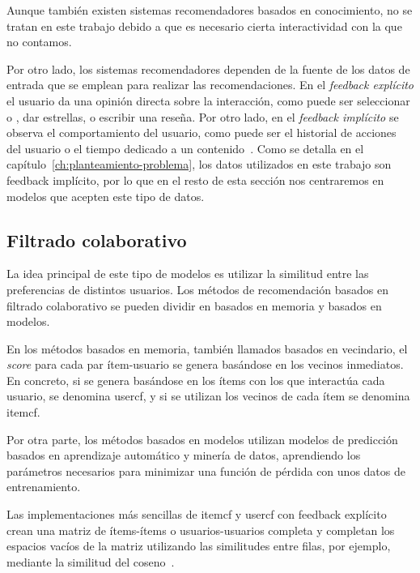Aunque también existen sistemas recomendadores basados en conocimiento, no se tratan en este trabajo debido a que es necesario cierta interactividad con la que no contamos.

Por otro lado, los sistemas recomendadores dependen de la fuente de los datos de entrada que se emplean para realizar las recomendaciones. En el \textit{feedback explícito} el usuario da una opinión directa sobre la interacción, como puede ser seleccionar  o , dar estrellas, o escribir una reseña. Por otro lado, en el \textit{feedback implícito} se observa el comportamiento del usuario, como puede ser el historial de acciones del usuario o el tiempo dedicado a un contenido~\cite{jawaheer_comparison_2010}. Como se detalla en el capítulo~\ref{ch:planteamiento-problema}, los datos utilizados en este trabajo son feedback implícito, por lo que en el resto de esta sección nos centraremos en modelos que acepten este tipo de datos.

\subsection{Filtrado colaborativo}

La idea principal de este tipo de modelos es utilizar la similitud entre las preferencias de distintos usuarios. Los métodos de recomendación basados en filtrado colaborativo se pueden dividir en basados en memoria y basados en modelos.

En los métodos basados en memoria, también llamados basados en vecindario, el \textit{score} para cada par ítem-usuario se genera basándose en los vecinos inmediatos. En concreto, si se genera basándose en los ítems con los que interactúa cada usuario, se denomina \gls{usercf}, y si se utilizan los vecinos de cada ítem se denomina \gls{itemcf}.

Por otra parte, los métodos basados en modelos utilizan modelos de predicción basados en aprendizaje automático y minería de datos, aprendiendo los parámetros necesarios para minimizar una función de pérdida con unos datos de entrenamiento.

Las implementaciones más sencillas de \gls{itemcf} y \gls{usercf} con feedback explícito crean una matriz de ítems-ítems o usuarios-usuarios completa y completan los espacios vacíos de la matriz utilizando las similitudes entre filas, por ejemplo, mediante la similitud del coseno~\cite{massquantity_librecommender_2020}.

